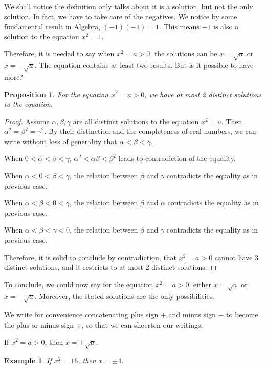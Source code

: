 \documentclass[12pt]{article}
\newtheorem*{proposition}{Proposition}
\newtheorem*{example}{Example}
\begin{document}
    We shall notice the definition only talks about it is a solution, but not the only solution. In fact, we have to take care of the negatives. We notice by some fundamental result in Algebra, $(-1)(-1)=1$. This means $-1$ is also a solution to the equation $x^2=1$.

    Therefore, it is needed to say when $x^2=a>0$, the solutions can be $x=\sqrt{a}$ or $x=-\sqrt{a}$. The equation contains at least two results. But is it possible to have more?

    \begin{proposition}
        For the equation $x^2=a>0$, we have at most 2 distinct solutions to the equation. 
    \end{proposition}

    \begin{proof}
        Assume $\alpha,\beta,\gamma$ are all distinct solutions to the equation $x^2=a$. Then $\alpha^2=\beta^2=\gamma^2$. By their distinction and the completeness of real numbers, we can write without loss of generality that $\alpha<\beta<\gamma$.

        When $0<\alpha<\beta<\gamma$, $\alpha^2<\alpha\beta<\beta^2$ leads to contradiction of the equality.

        When $\alpha<0<\beta<\gamma$, the relation between $\beta$ and $\gamma$ contradicts the equality as in previous case.

        When $\alpha<\beta<0<\gamma$, the relation between $\beta$ and $\alpha$ contradicts the equality as in previous case.

        When $\alpha<\beta<\gamma<0$, the relation between $\beta$ and $\gamma$ contradicts the equality as in previous case.

        Therefore, it is solid to conclude by contradiction, that $x^2=a>0$ cannot have 3 distinct solutions, and it restricts to at most 2 distinct solutions.
    \end{proof}

    To conclude, we could now say for the equation $x^2=a>0$, either $x=\sqrt{a}$ or $x=-\sqrt{a}$. Moreover, the stated solutions are the only possibilities.

    We write for convenience concatenating plus sign $+$ and minus sign $-$ to become the plus-or-minus sign $\pm$, so that we can shoerten our writings:

    If $x^2=a>0$, then $x=\pm \sqrt{a}$.
    
    \begin{example}
        If $x^2=16$, then $x=\pm 4$.
    \end{example}
\end{document}
